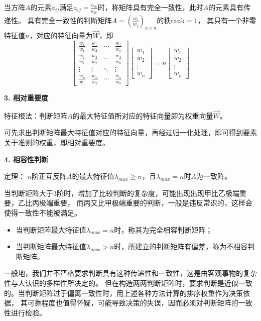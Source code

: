 \documentclass[a4paper,12pt]{article}
\begin{document}
当方阵$A$的元素$a_{ij}$满足$a_{ij}=\frac{a_{ik}}{a_{jk}}$时，称矩阵具有完全一致性，此时$A$的元素具有传递性。
具有完全一致性的判断矩阵$A=\left(\frac{w_i}{w_j}\right)_{n\times n}$的秩$\text{rank}=1$，
其只有一个非零特征值$n$，对应的特征向量为$\overrightarrow W$，即
$$
\begin{bmatrix}\frac{w_1}{w_1} & \frac{w_1}{w_2} & \cdots & \frac{w_1}{w_n} \\\frac{w_2}{w_1} & \frac{w_2}{w_2} & \cdots & \frac{w_2}{w_n} \\\vdots & \vdots & \ddots & \vdots \\\frac{w_n}{w_1} & \frac{w_n}{w_2} & \cdots & \frac{w_n}{w_n} \end{bmatrix}\begin{bmatrix}w_1 \\w_2 \\\vdots \\w_n\end{bmatrix}=n\begin{bmatrix}w_1 \\w_2 \\\vdots \\w_n\end{bmatrix}
$$

\noindent
\textbf{3. 相对重要度}
 
特征根法：判断矩阵$A$的最大特征值所对应的特征向量即为权重向量$\overrightarrow W$。

可先求出判断矩阵最大特征值对应的特征向量，再经过归一化处理，即可得到要素关于准则的权重，即相对重要度。

\noindent
\textbf{4. 相容性判断}

定理： $n$阶正互反阵$A$的最大特征值$\lambda_{max}\ge n$，且$\lambda_{max}=n$时$A$为一致阵。

当判断矩阵大于$3$阶时，增加了比较判断的复杂度，可能出现出现甲比乙极端重要，乙比丙极端重要，
而丙又比甲极端重要的判断，一般是违反常识的，这样会使得一致性不能被满足。

\begin{itemize}[itemsep=0pt,parsep=0pt]
    \item 当判断矩阵最大特征值$\lambda_{max}=n$时，称其为完全相容判断矩阵；
    \item 当判断矩阵最大特征值$\lambda_{max}>n$时，所建立的判断矩阵有偏差，称为不相容判断矩阵。
\end{itemize}

一般地，我们并不严格要求判断具有这种传递性和一致性，这是由客观事物的复杂性与人认识的多样性所决定的。
但在构造两两判断矩阵时，要求判断是近似一致的。当判断矩阵过于偏离一致性时，用上述各种方法计算的排序权重作为决策依据，
其可靠程度也值得怀疑，可能导致决策的失误，因而必须对判断矩阵的一致性进行检验。
\end{document}
